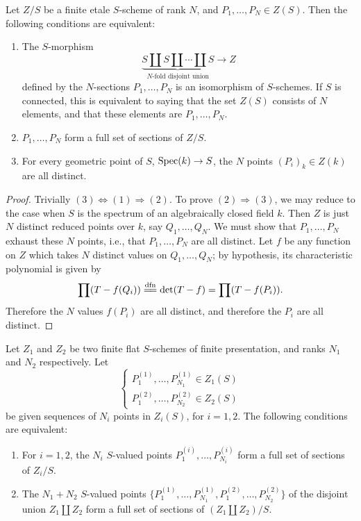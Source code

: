 \begin{lemma}\label{lem:1.8.3}
Let $Z/S$ be a finite etale $S$-scheme of rank $N$, and $P_1, \dots, P_N \in Z(S)$. Then the following conditions are equivalent:
\begin{enumerate}[(1)]
\item The $S$-morphism
\[
\underbrace{S \amalg S \amalg \cdots \amalg S}_{N\text{-fold disjoint union}} \longrightarrow Z
\]
defined by the $N$-sections $P_1, \dots, P_N$ is an isomorphism of $S$-schemes. If $S$ is connected, this is equivalent to saying that the set $Z(S)$ consists of $N$ elements, and that these elements are $P_1, \dots, P_N$.
\item $P_1, \dots, P_N$ form a full set of sections of $Z/S$.
\item For every geometric point of $S$, $\operatorname{Spec}(k) \to S$, the $N$ points $(P_i)_k \in Z(k)$ are all distinct.
\end{enumerate}
\end{lemma}

\begin{proof}
Trivially $(3) \Longleftrightarrow (1) \Longrightarrow (2)$. To prove $(2) \Longrightarrow (3)$, we may reduce to the case when $S$ is the spectrum of an algebraically closed field $k$. Then $Z$ is just $N$ distinct reduced points over $k$, say $Q_1, \dots, Q_N$. We must show that $P_1, \dots, P_N$ exhaust these $N$ points, i.e., that $P_1, \dots, P_N$ are all distinct. Let $f$ be any function on $Z$ which takes $N$ distinct values on $Q_1, \dots, Q_N$; by hypothesis, its characteristic polynomial is given by
\[
\prod (T-f(Q_i)) \xlongequal{dfn} \det(T-f) = \prod (T-f(P_i)).
\]
Therefore the $N$ values $f(P_i)$ are all distinct, and therefore the $P_i$ are all distinct.
\end{proof}

\begin{lemma}\label{lem:1.8.4}
Let $Z_1$ and $Z_2$ be two finite flat $S$-schemes of finite presentation, and ranks $N_1$ and $N_2$ respectively. Let
\[
\begin{cases}
P_1^{(1)}, \dots, P_{N_1}^{(1)} \in Z_1(S) \\
P_1^{(2)}, \dots, P_{N_2}^{(2)} \in Z_2(S)
\end{cases}
\]
be given sequences of $N_i$ points in $Z_i(S)$, for $i = 1, 2$. The following conditions are equivalent:
\begin{enumerate}[(1)]
\item For $i = 1, 2$, the $N_i$ $S$-valued points $P_1^{(i)}, \dots, P_{N_i}^{(i)}$ form a full set of sections of $Z_i/S$.
\item The $N_1 + N_2$ $S$-valued points $\{P_1^{(1)}, \dots, P_{N_1}^{(1)}, P_1^{(2)}, \dots, P_{N_2}^{(2)}\}$ of the disjoint union $Z_1 \amalg Z_2$ form a full set of sections of $(Z_1 \amalg Z_2)/S$.
\end{enumerate}
\end{lemma}

